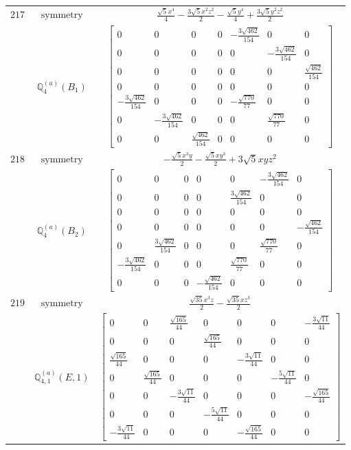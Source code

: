 \documentclass[fleqn,8pt,landscape]{jsarticle}
\begin{document}
\begin{longtable}{ccc}
$ 217 $ & $ \text{symmetry} $ & $ \frac{\sqrt{5} x^{4}}{4} - \frac{3 \sqrt{5} x^{2} z^{2}}{2} - \frac{\sqrt{5} y^{4}}{4} + \frac{3 \sqrt{5} y^{2} z^{2}}{2} $ \\
$  $ & $ \mathbb{Q}_{4}^{(a)}(B_{1}) $ & $ \begin{bmatrix} 0 & 0 & 0 & 0 & - \frac{3 \sqrt{462}}{154} & 0 & 0 \\ 0 & 0 & 0 & 0 & 0 & - \frac{3 \sqrt{462}}{154} & 0 \\ 0 & 0 & 0 & 0 & 0 & 0 & \frac{\sqrt{462}}{154} \\ 0 & 0 & 0 & 0 & 0 & 0 & 0 \\ - \frac{3 \sqrt{462}}{154} & 0 & 0 & 0 & - \frac{\sqrt{770}}{77} & 0 & 0 \\ 0 & - \frac{3 \sqrt{462}}{154} & 0 & 0 & 0 & \frac{\sqrt{770}}{77} & 0 \\ 0 & 0 & \frac{\sqrt{462}}{154} & 0 & 0 & 0 & 0 \end{bmatrix} $ \\ \hline
$ 218 $ & $ \text{symmetry} $ & $ - \frac{\sqrt{5} x^{3} y}{2} - \frac{\sqrt{5} x y^{3}}{2} + 3 \sqrt{5} x y z^{2} $ \\
$  $ & $ \mathbb{Q}_{4}^{(a)}(B_{2}) $ & $ \begin{bmatrix} 0 & 0 & 0 & 0 & 0 & - \frac{3 \sqrt{462}}{154} & 0 \\ 0 & 0 & 0 & 0 & \frac{3 \sqrt{462}}{154} & 0 & 0 \\ 0 & 0 & 0 & 0 & 0 & 0 & 0 \\ 0 & 0 & 0 & 0 & 0 & 0 & - \frac{\sqrt{462}}{154} \\ 0 & \frac{3 \sqrt{462}}{154} & 0 & 0 & 0 & \frac{\sqrt{770}}{77} & 0 \\ - \frac{3 \sqrt{462}}{154} & 0 & 0 & 0 & \frac{\sqrt{770}}{77} & 0 & 0 \\ 0 & 0 & 0 & - \frac{\sqrt{462}}{154} & 0 & 0 & 0 \end{bmatrix} $ \\ \hline
$ 219 $ & $ \text{symmetry} $ & $ \frac{\sqrt{35} x^{3} z}{2} - \frac{\sqrt{35} x z^{3}}{2} $ \\
$  $ & $ \mathbb{Q}_{4,1}^{(a)}(E,1) $ & $ \begin{bmatrix} 0 & 0 & \frac{\sqrt{165}}{44} & 0 & 0 & 0 & - \frac{3 \sqrt{11}}{44} \\ 0 & 0 & 0 & \frac{\sqrt{165}}{44} & 0 & 0 & 0 \\ \frac{\sqrt{165}}{44} & 0 & 0 & 0 & - \frac{3 \sqrt{11}}{44} & 0 & 0 \\ 0 & \frac{\sqrt{165}}{44} & 0 & 0 & 0 & - \frac{5 \sqrt{11}}{44} & 0 \\ 0 & 0 & - \frac{3 \sqrt{11}}{44} & 0 & 0 & 0 & - \frac{\sqrt{165}}{44} \\ 0 & 0 & 0 & - \frac{5 \sqrt{11}}{44} & 0 & 0 & 0 \\ - \frac{3 \sqrt{11}}{44} & 0 & 0 & 0 & - \frac{\sqrt{165}}{44} & 0 & 0 \end{bmatrix} $ \\ \hline

\end{longtable}
\end{document}
